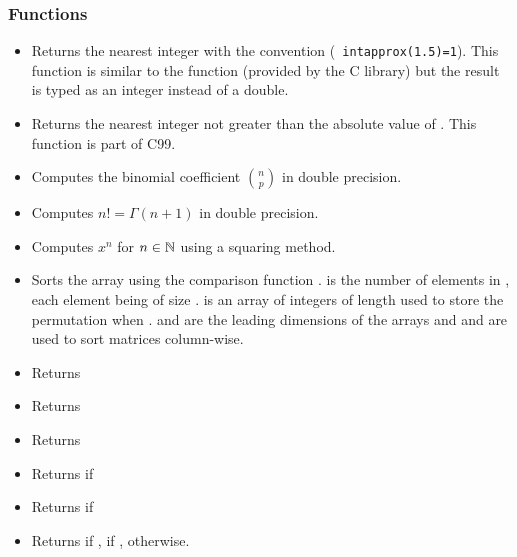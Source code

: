 \subsubsection{Functions}
\begin{itemize}
\item {}
  \sshortdescribe Returns the nearest integer with the convention ({\tt
  intapprox(1.5)=1}). This function is similar to the  function
  (provided by the C library) but the result is typed as an integer instead of a
  double.

\item {}
  \sshortdescribe Returns the nearest integer not greater than the absolute
  value of . This function is part of C99.

\item {}
  \sshortdescribe Computes the binomial coefficient $\binom{n}{p}$ in double
  precision.

\item {}
  \sshortdescribe Computes $n! = \Gamma(n+1)$ in double precision.

\item {}
  \sshortdescribe Computes $x^n$ for $n \in {\mathbb N}$ using a squaring method.


\item {}
  \sshortdescribe Sorts the array  using the comparison function
  .  is the number of elements in , each element being of
  size .  is an array of integers of length  used to store
  the permutation when .  and  are the
  leading dimensions of the arrays  and  and are used to sort
  matrices column-wise. 

\item {}
  \sshortdescribe Returns 

\item {}
  \sshortdescribe Returns  

\item {}
  \sshortdescribe Returns  

\item {}
  \sshortdescribe Returns  if 

\item {}
  \sshortdescribe Returns  if 

\item {}
  \sshortdescribe Returns  if ,  if ,
   otherwise.
\end{itemize}

